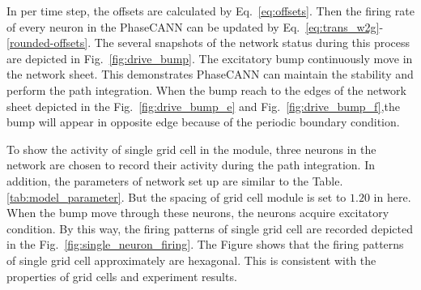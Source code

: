 \documentclass[preprint,12pt]{elsarticle}
\begin{document}
In per time step, the offsets are calculated by Eq.~\eqref{eq:offsets}. Then the firing rate of every neuron in the PhaseCANN can be updated by Eq.~\eqref{eq:trans_w2g}-\eqref{rounded-offsets}. The several snapshots of the network status during this process are depicted in Fig.~\ref{fig:drive_bump}. The excitatory bump continuously move in the network sheet. This demonstrates PhaseCANN can maintain the stability and perform the path integration. When the bump reach to the edges of the network sheet depicted in the Fig.~\ref{fig:drive_bump_e} and Fig.~\ref{fig:drive_bump_f},the bump will appear in opposite edge because of the periodic boundary condition.

To show the activity of single grid cell in the module, three neurons in the network are chosen to record their activity during the path integration. In addition, the parameters of network set up are similar to the  Table.\ref{tab:model_parameter}. But the spacing of grid cell module is set to $1.20$ in here. When the bump move through these neurons, the neurons acquire excitatory condition. By this way, the firing patterns of single grid cell are recorded depicted in the Fig.~\ref{fig:single_neuron_firing}. The Figure shows that the firing patterns of single grid cell approximately are hexagonal. This is consistent with the properties of grid cells and experiment results\cite{Hafting2005}.
\end{document}
